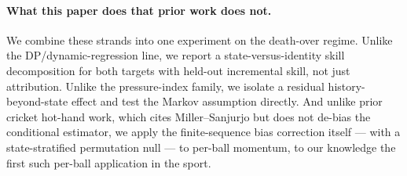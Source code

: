 \paragraph{What this paper does that prior work does not.}
We combine these strands into one experiment on the death-over regime. Unlike the
DP/dynamic-regression line, we report a state-versus-identity skill decomposition
for both targets with held-out incremental skill, not just attribution. Unlike
the pressure-index family, we isolate a residual history-beyond-state effect and
test the Markov assumption directly. And unlike prior cricket hot-hand work, which
cites Miller--Sanjurjo but does not de-bias the conditional estimator, we apply the
finite-sequence bias correction itself --- with a state-stratified permutation null
--- to per-ball momentum, to our knowledge the first such per-ball application in
the sport.
